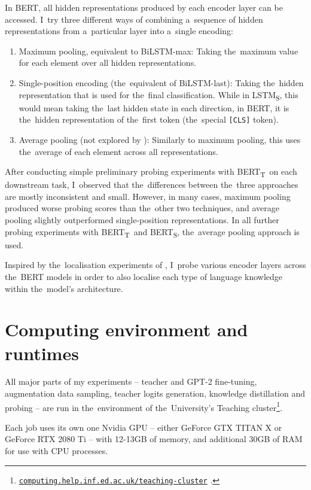 \documentclass[bsc,frontabs,singlespacing,parskip,deptreport]{infthesis}
\def\BERTT{BERT\textsubscript{T}}
\def\BERTS{BERT\textsubscript{S}}
\def\LSTMS{LSTM\textsubscript{S}}
\newcommand\rurl[1]{%
  \href{https://#1}{\nolinkurl{#1}}%
}
\begin{document}
{{{      In BERT, all hidden representations produced by each encoder layer can be accessed. I~try three different ways of combining a~sequence of hidden representations from a~particular layer into a~single encoding:
      \begin{enumerate}
        \item Maximum pooling, equivalent to BiLSTM-max: Taking the~maximum value for each element over all hidden representations.
        \item Single-position encoding (the~equivalent of BiLSTM-last): Taking the~hidden representation that is used for the~final classification. While in \LSTMS, this would mean taking the~last hidden state in each direction, in BERT, it is the~hidden representation of the~first token (the~special \verb|[CLS]| token).
        \item Average pooling (not explored by \citeauthor{Conneau_2018}): Similarly to maximum pooling, this uses the~average of each element across all representations.
      \end{enumerate}
      After conducting simple preliminary probing experiments with \BERTT~on each downstream task, I~observed that the~differences between the~three approaches are mostly inconsistent and small. However, in many cases, maximum pooling produced worse probing scores than the~other two techniques, and average pooling slightly outperformed single-position representations. In all further probing experiments with \BERTT~and \BERTS, the~average pooling approach is used.

      Inspired by the~localisation experiments of \citet{Tenney_2019b}, I~probe various encoder layers across the~BERT models in order to also localise each type of language knowledge within the~model's architecture.
    }
  }

  \section{Computing environment and runtimes}{
    All major parts of my experiments -- teacher and GPT-2 fine-tuning, augmentation data sampling, teacher logits generation, knowledge distillation and probing -- are run in the~environment of the~University's Teaching cluster\footnote{\rurl{computing.help.inf.ed.ac.uk/teaching-cluster}.}.

    Each job uses its own one Nvidia GPU -- either GeForce GTX TITAN X or GeForce RTX 2080 Ti -- with 12-13GB of memory, and additional 30GB of RAM for use with CPU processes.

}}
\end{document}

